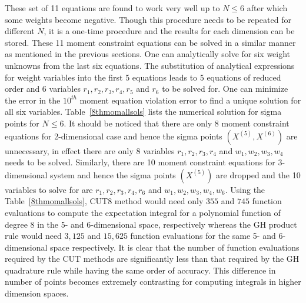 \documentclass[letterpaper, 10 pt, conference]{IEEEtran}  %
\begin{document}
These set of 11 equations are found to work very well up to $N\le 6$ after which some weights become negative. Though this procedure needs to be repeated for different $N$, it is a one-time procedure and the results for each dimension can be stored. These 11 moment constraint equations can be solved in a similar manner as mentioned in the previous sections. One can analytically solve for six weight unknowns from the last six equations. The substitution of analytical expressions for weight variables into the first 5 equations leads to 5 equations of reduced order and 6 variables $r_1,r_2,r_3,r_4,r_5$ and $r_6$ to be solved for. One can minimize the error in the $10^{th}$ moment equation violation error to find a unique solution for all six variables. Table~\ref{8thmomallsols} lists the numerical solution for sigma points for $N\le 6$.   It should be noticed that there are only 8 moment constraint equations for 2-dimensional case and hence the sigma points $(X^{(5)},X^{(6)})$  are unnecessary, in effect there are only 8 variables $r_1,r_2,r_3,r_4$ and $w_1,w_2,w_3,w_4$ needs to be solved. Similarly, there are 10 moment constraint equations for 3-dimensional system and hence the sigma points $(X^{(5)})$ are dropped and the 10 variables to solve for are $r_1,r_2,r_3,r_4,r_6$ and $w_1,w_2,w_3,w_4,w_6$. Using the Table~\ref{8thmomallsols}, CUT8 method would need only $355$ and $745$ function evaluations to compute the expectation integral for a polynomial function of degree 8 in the 5- and 6-dimensional space, respectively whereas the GH product rule would need $3,125$ and $15,625$ function evaluations for the same 5- and 6-dimensional space respectively. It is clear that the number of function evaluations required by the CUT methods are significantly less than that required by the GH quadrature rule while having the same order of accuracy. This difference in number of points becomes extremely contrasting for computing integrals in higher dimension spaces. 
 
\end{document}
